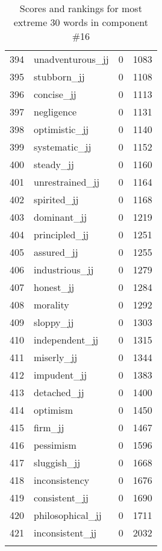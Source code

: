 \begin{longtable}[!htbp]{| rlr@{.}l |}
    394 & unadventurous\_jj & 0 & 1083 \\
    395 & stubborn\_jj & 0 & 1108 \\
    396 & concise\_jj & 0 & 1113 \\
    397 & negligence & 0 & 1131 \\
    398 & optimistic\_jj & 0 & 1140 \\
    399 & systematic\_jj & 0 & 1152 \\
    400 & steady\_jj & 0 & 1160 \\
    401 & unrestrained\_jj & 0 & 1164 \\
    402 & spirited\_jj & 0 & 1168 \\
    403 & dominant\_jj & 0 & 1219 \\
    404 & principled\_jj & 0 & 1251 \\
    405 & assured\_jj & 0 & 1255 \\
    406 & industrious\_jj & 0 & 1279 \\
    407 & honest\_jj & 0 & 1284 \\
    408 & morality & 0 & 1292 \\
    409 & sloppy\_jj & 0 & 1303 \\
    410 & independent\_jj & 0 & 1315 \\
    411 & miserly\_jj & 0 & 1344 \\
    412 & impudent\_jj & 0 & 1383 \\
    413 & detached\_jj & 0 & 1400 \\
    414 & optimism & 0 & 1450 \\
    415 & firm\_jj & 0 & 1467 \\
    416 & pessimism & 0 & 1596 \\
    417 & sluggish\_jj & 0 & 1668 \\
    418 & inconsistency & 0 & 1676 \\
    419 & consistent\_jj & 0 & 1690 \\
    420 & philosophical\_jj & 0 & 1711 \\
    421 & inconsistent\_jj & 0 & 2032 \\
    \hline
    \caption{Scores and rankings for most extreme 30 words in component \#16} \\
\end{longtable}
